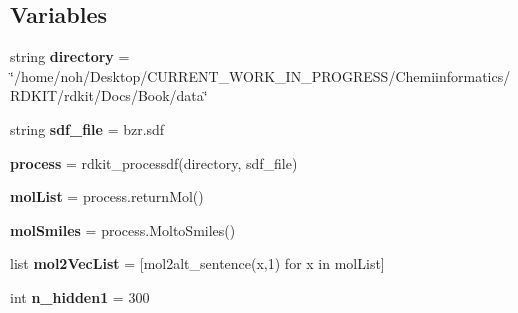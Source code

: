 \subsection*{Variables}
\begin{DoxyCompactItemize}
\item 
\mbox{\label{namespacechemistry2quant_1_1chem2quant__analysis_aa425a3a32b624b3b85403ce5b02117a2}} 
string {\bfseries directory} = \char`\"{}/home/noh/Desktop/C\+U\+R\+R\+E\+N\+T\+\_\+\+W\+O\+R\+K\+\_\+\+I\+N\+\_\+\+P\+R\+O\+G\+R\+E\+SS/Chemiinformatics/R\+D\+K\+IT/rdkit/Docs/Book/data\char`\"{}
\item 
\mbox{\label{namespacechemistry2quant_1_1chem2quant__analysis_a6a60e479c89a6ce5b45a773975d5a338}} 
string {\bfseries sdf\+\_\+file} = \textquotesingle{}bzr.\+sdf\textquotesingle{}
\item 
\mbox{\label{namespacechemistry2quant_1_1chem2quant__analysis_a1bf76568a72e486d531841905fdde599}} 
{\bfseries process} = rdkit\+\_\+processdf(directory, sdf\+\_\+file)
\item 
\mbox{\label{namespacechemistry2quant_1_1chem2quant__analysis_afa8eaf38c632fe7394eb202dad83df62}} 
{\bfseries mol\+List} = process.\+return\+Mol()
\item 
\mbox{\label{namespacechemistry2quant_1_1chem2quant__analysis_a2c39d2f4caa1c4b277791bf793499d18}} 
{\bfseries mol\+Smiles} = process.\+Molto\+Smiles()
\item 
\mbox{\label{namespacechemistry2quant_1_1chem2quant__analysis_a7864a43f1dbb4a3a1c15dc6cd297b63e}} 
list {\bfseries mol2\+Vec\+List} = \mbox{[}mol2alt\+\_\+sentence(x,1) for x in mol\+List\mbox{]}
\item 
\mbox{\label{namespacechemistry2quant_1_1chem2quant__analysis_a88c20c3b113b279415e137750a664f2b}} 
int {\bfseries n\+\_\+hidden1} = 300
\item 
\mbox{\label{namespacechemistry2quant_1_1chem2quant__analysis_ac89b6a23f0dd409c07840675c1a9dd1d}} 

\end{DoxyCompactItemize}
